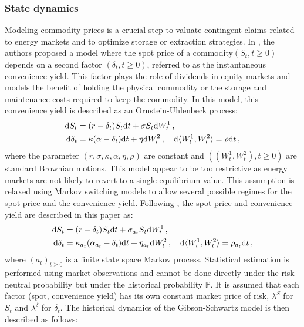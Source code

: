 \subsubsection*{State dynamics}
Modeling commodity prices is a crucial step to valuate contingent claims related to energy markets and to optimize storage or extraction strategies. In \cite{gibson:schwartz:1990,schwartz:1997}, the authors proposed a model where the spot price of a commodity$(S_t, t \geq 0)$ depends on a second factor $(\delta_t, t \geq 0)$, referred to as the instantaneous convenience yield. This factor plays the role of dividends in equity markets and models the benefit of holding the physical commodity or the storage and maintenance costs required to keep the commodity. In this model, this convenience yield is described as an Ornstein-Uhlenbeck process:
\begin{align*}
\mathrm{d} S_{t} & = (r-\delta_{t})S_{t}\mathrm{d} t+\sigma S_{t} \mathrm{d} W_{t}^{1} \,,\\
\mathrm{d} \delta_{t} & = \kappa(\alpha-\delta_{t})\mathrm{d} t+\eta \mathrm{d} W_{t}^{2} \,, \quad \mathrm{d} \langle W_t^1, W_t^2\rangle = \rho \mathrm{d} t\,,
\end{align*}
where the parameter $\left(r, \sigma, \kappa, \alpha, \eta, \rho \right)$ are constant and $( (W_t^1,W_t^2), t \geq 0)$ are standard Brownian motions. This model appear to be too restrictive as energy markets are not likely to revert to a single equilibrium value. This assumption is relaxed using Markov switching models to allow several possible regimes for the spot price and the convenience yield. Following \cite{almansour:2016}, the spot price and convenience yield are described in this paper as:
\begin{align*}
\mathrm{d} S_{t} & = (r-\delta_{t})S_{t}\mathrm{d} t+\sigma_{a_t} S_{t}\mathrm{d} W_{t}^{1} \,,\\
\mathrm{d}\delta_{t} & = \kappa_{a_t}(\alpha_{a_t} -\delta_{t})\mathrm{d} t+\eta_{a_t} \mathrm{d} W_{t}^{2} \,, \quad \mathrm{d}\langle W_t^1, W_t^2\rangle = \rho_{a_t} \mathrm{d} t\,,
\end{align*}
where $(a_t)_{t\ge 0}$ is a finite state space Markov process.
Statistical estimation is performed using market observations and cannot be done directly under the risk-neutral probability but under the historical probability $\mathbb{P}$. It is assumed that each factor (spot, convenience yield) has its own constant market price of risk, $\lambda^S$ for $S_t$ and $\lambda^{\delta}$ for $\delta_t$. The historical dynamics of the Gibson-Schwartz model is then described as follows:
